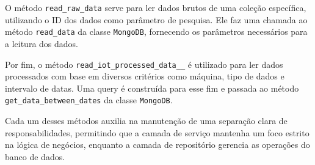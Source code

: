 O método \texttt{read\_raw\_data} serve para ler dados brutos de uma coleção específica, utilizando o ID dos dados como parâmetro de pesquisa. Ele faz uma chamada ao método \texttt{read\_data} da classe \texttt{MongoDB}, fornecendo os parâmetros necessários para a leitura dos dados.

Por fim, o método \texttt{read\_iot\_processed\_data\_\_} é utilizado para ler dados processados com base em diversos critérios como máquina, tipo de dados e intervalo de datas. Uma query é construída para esse fim e passada ao método \texttt{get\_data\_between\_dates} da classe \texttt{MongoDB}.

Cada um desses métodos auxilia na manutenção de uma separação clara de responsabilidades, permitindo que a camada de serviço mantenha um foco estrito na lógica de negócios, enquanto a camada de repositório gerencia as operações do banco de dados.



